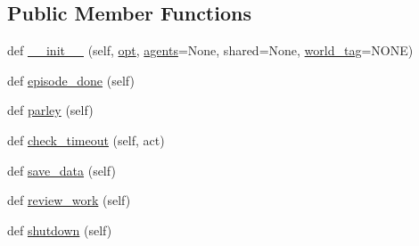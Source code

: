 \subsection*{Public Member Functions}
\begin{DoxyCompactItemize}
\item 
def \hyperlink{classstack__rank__evals_1_1worlds_1_1MTurkImageChatStackRankWorld_aee5ebf396ed850b0121c2bfb3cb871d3}{\+\_\+\+\_\+init\+\_\+\+\_\+} (self, \hyperlink{classparlai_1_1core_1_1worlds_1_1World_a3640d92718acd3e6942a28c1ab3678bd}{opt}, \hyperlink{classstack__rank__evals_1_1worlds_1_1MTurkImageChatStackRankWorld_a3c5fb45d68aec332f20317c2364227c7}{agents}=None, shared=None, \hyperlink{classstack__rank__evals_1_1worlds_1_1MTurkImageChatStackRankWorld_a7b42699f381f01295b605767127fbc78}{world\+\_\+tag}=\textquotesingle{}N\+O\+NE\textquotesingle{})
\item 
def \hyperlink{classstack__rank__evals_1_1worlds_1_1MTurkImageChatStackRankWorld_a518e69078a38528380731c4f1aa32149}{episode\+\_\+done} (self)
\item 
def \hyperlink{classstack__rank__evals_1_1worlds_1_1MTurkImageChatStackRankWorld_ace7af06e8b400b73e2d122b00293ec69}{parley} (self)
\item 
def \hyperlink{classstack__rank__evals_1_1worlds_1_1MTurkImageChatStackRankWorld_a9c6f889227e1aec6ad1dbaa4150b1625}{check\+\_\+timeout} (self, act)
\item 
def \hyperlink{classstack__rank__evals_1_1worlds_1_1MTurkImageChatStackRankWorld_a54a526f54b82c3de45d3d2edad9a6658}{save\+\_\+data} (self)
\item 
def \hyperlink{classstack__rank__evals_1_1worlds_1_1MTurkImageChatStackRankWorld_a47f6f4ec8f01b20228f9ed3c4cc4726f}{review\+\_\+work} (self)
\item 
def \hyperlink{classstack__rank__evals_1_1worlds_1_1MTurkImageChatStackRankWorld_ab273e639ff15f9c20a49d478abb4aa31}{shutdown} (self)
\end{DoxyCompactItemize}
